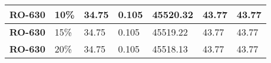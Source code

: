 \begin{table}[h!]
\begin{tabular}{|l|l|l|l|l|l|l|}
\textbf{RO-630}            & 10\%                                                                                         & 34.75                                           & 0.105                                     & 45520.32               & 43.77              & 43.77                                \\ \hline
\textbf{RO-630}            & 15\%                                                                                         & 34.75                                           & 0.105                                     & 45519.22               & 43.77              & 43.77                                \\ \hline
\textbf{RO-630}            & 20\%                                                                                         & 34.75                                           & 0.105                                     & 45518.13               & 43.77              & 43.77                                \\ \hline
\end{tabular}
\label{CostElectricity}
\end{table}

